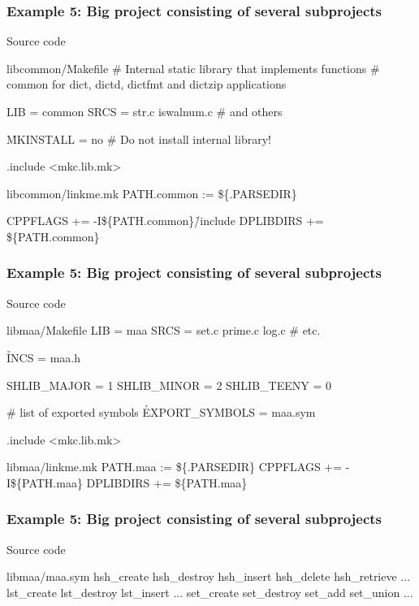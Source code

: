 \documentclass[hyperref={colorlinks=true}]{beamer}
\begin{document}
\begin{frame}[fragile]
  \frametitle{Example 5: Big project consisting of several subprojects}

  \begin{block}{Source code}
  \begin{Code}{libcommon/Makefile}
# Internal static library that implements functions
# common for dict, dictd, dictfmt and dictzip applications

LIB =            common
SRCS =           str.c iswalnum.c # and others

\h{MKINSTALL} =   no # Do not install internal library!

.include <mkc.lib.mk>
  \end{Code}
  \begin{Code}{libcommon/linkme.mk}
PATH.common :=      \$\{.PARSEDIR\}

CPPFLAGS +=      -I\$\{PATH.common\}\h{/include}
DPLIBDIRS +=     \$\{PATH.common\}
  \end{Code}
  \end{block}
\end{frame}

\begin{frame}[fragile]
  \frametitle{Example 5: Big project consisting of several subprojects}

  \begin{block}{Source code}
  \begin{Code}{libmaa/Makefile}
LIB =       maa
SRCS =      set.c prime.c log.c # etc.

\h{INCS} =      maa.h

SHLIB_MAJOR =    1
SHLIB_MINOR =    2
SHLIB_TEENY =    0

# list of exported symbols
\h{EXPORT\_SYMBOLS} = maa.sym

.include <mkc.lib.mk>
  \end{Code}
  \begin{Code}{libmaa/linkme.mk}
PATH.maa :=      \$\{.PARSEDIR\}
CPPFLAGS +=      -I\$\{PATH.maa\}
DPLIBDIRS +=     \$\{PATH.maa\}
  \end{Code}
  \end{block}
\end{frame}

\begin{frame}[fragile]
  \frametitle{Example 5: Big project consisting of several subprojects}

  \begin{block}{Source code}
  \begin{Code}{libmaa/maa.sym}
hsh_create
hsh_destroy
hsh_insert
hsh_delete
hsh_retrieve
...
lst_create
lst_destroy
lst_insert
...
set_create
set_destroy
set_add
set_union
...
  \end{Code}
  \end{block}
\end{frame}
\end{document}
